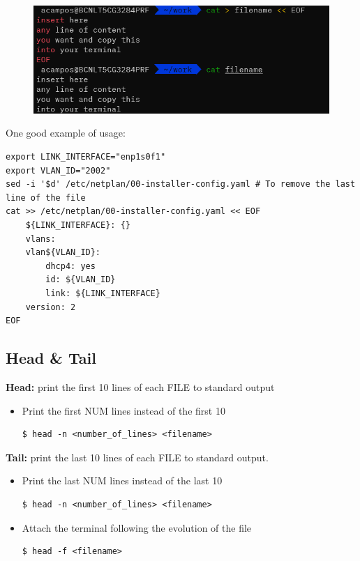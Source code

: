 \documentclass{article}
\newenvironment{codetemplate}[1][]{%
  \mybasecolorbox[#1]
  \itshape
}{%
  \endmybasecolorbox
}
\begin{document}
\begin{figure}[H]
    \centering
    \includegraphics[scale=0.8]{pictures/eof2.png}
\end{figure}

One good example of usage:
\begin{codetemplate}{}
\begin{verbatim}
export LINK_INTERFACE="enp1s0f1"
export VLAN_ID="2002"
sed -i '$d' /etc/netplan/00-installer-config.yaml # To remove the last line of the file
cat >> /etc/netplan/00-installer-config.yaml << EOF
    ${LINK_INTERFACE}: {}
    vlans:
    vlan${VLAN_ID}:
        dhcp4: yes
        id: ${VLAN_ID}
        link: ${LINK_INTERFACE}
    version: 2
EOF
\end{verbatim}
\end{codetemplate}

\subsection{Head \& Tail}

\textbf{Head:} print the first 10 lines of each FILE to standard output

\begin{itemize}
    \item Print the first NUM lines instead of the first 10
\begin{codetemplate}{}
\begin{verbatim}
$ head -n <number_of_lines> <filename>
\end{verbatim}
\end{codetemplate}
\end{itemize}

\textbf{Tail:}  print the last 10 lines of each FILE to standard output.

\begin{itemize}
    \item Print the last NUM lines instead of the last 10
\begin{codetemplate}{}
\begin{verbatim}
$ head -n <number_of_lines> <filename>
\end{verbatim}
\end{codetemplate}

    \item Attach the terminal following the evolution of the file
\begin{codetemplate}{}
\begin{verbatim}
$ head -f <filename>
\end{verbatim}
\end{codetemplate}
\end{itemize}
\end{document}
